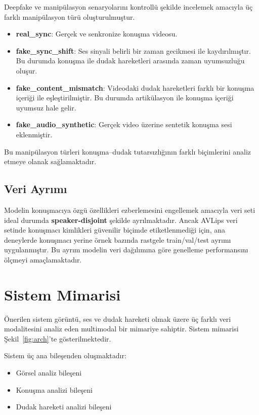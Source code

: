 \documentclass[conference]{IEEEtran}
\begin{document}
Deepfake ve manipülasyon senaryolarını kontrollü şekilde incelemek amacıyla üç farklı manipülasyon türü oluşturulmuştur.

\begin{itemize}
  \item \textbf{real\_sync}: Gerçek ve senkronize konuşma videosu.
  \item \textbf{fake\_sync\_shift}: Ses sinyali belirli bir zaman gecikmesi ile kaydırılmıştır. Bu durumda konuşma ile dudak hareketleri arasında zaman uyumsuzluğu oluşur.
  \item \textbf{fake\_content\_mismatch}: Videodaki dudak hareketleri farklı bir konuşma içeriği ile eşleştirilmiştir. Bu durumda artikülasyon ile konuşma içeriği uyumsuz hale gelir.
  \item \textbf{fake\_audio\_synthetic}: Gerçek video üzerine sentetik konuşma sesi eklenmiştir.
\end{itemize}

Bu manipülasyon türleri konuşma--dudak tutarsızlığının farklı biçimlerini analiz etmeye olanak sağlamaktadır.

\subsection{Veri Ayrımı}

Modelin konuşmacıya özgü özellikleri ezberlemesini engellemek amacıyla veri seti ideal durumda \textbf{speaker-disjoint} şekilde ayrılmaktadır. Ancak AVLips veri setinde konuşmacı kimlikleri güvenilir biçimde etiketlenmediği için, ana deneylerde konuşmacı yerine örnek bazında rastgele train/val/test ayrımı uygulanmıştır. Bu ayrım modelin veri dağılımına göre genelleme performansını ölçmeyi amaçlamaktadır.

\section{Sistem Mimarisi}

Önerilen sistem görüntü, ses ve dudak hareketi olmak üzere üç farklı veri modalitesini analiz eden multimodal bir mimariye sahiptir. Sistem mimarisi Şekil~\ref{fig:arch}'te gösterilmektedir.

Sistem üç ana bileşenden oluşmaktadır:

\begin{itemize}
  \item Görsel analiz bileşeni
  \item Konuşma analizi bileşeni
  \item Dudak hareketi analizi bileşeni
\end{itemize}
\end{document}
